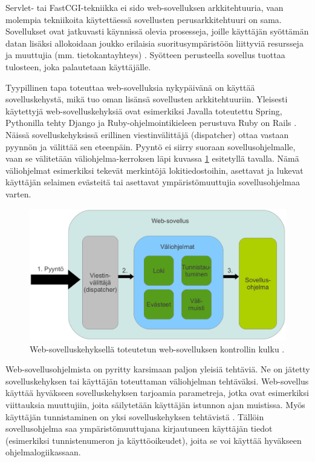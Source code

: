 Servlet- tai FastCGI-tekniikka ei sido web-sovelluksen arkkitehtuuria, vaan molempia tekniikoita käytettäessä sovellusten perusarkkitehtuuri on sama. Sovellukset ovat jatkuvasti käynnissä olevia prosesseja, joille käyttäjän syöttämän datan lisäksi allokoidaan joukko erilaisia suoritusympäristöön liittyviä resursseja ja muuttujia (mm. tietokantayhteys) \cite{uml}. Syötteen perusteella sovellus tuottaa tulosteen, joka palautetaan käyttäjälle.

Tyypillinen tapa toteuttaa web-sovelluksia nykypäivänä on käyttää sovelluskehystä, mikä tuo oman lisänsä sovellusten arkkitehtuuriin. Yleisesti käytettyjä web-sovelluskehyksiä ovat esimerkiksi Javalla toteutettu Spring, Pythonilla tehty Django ja Ruby-ohjelmointikieleen perustuva Ruby on Rails \cite{spring, django, ruby2011agile}. Näissä sovelluskehyksissä erillinen viestinvälittäjä (dispatcher) ottaa vastaan pyynnön ja välittää sen eteenpäin. Pyyntö ei siirry suoraan sovellusohjelmalle, vaan se välitetään väliohjelma-kerroksen läpi kuvassa \ref{dispatcher} esitetyllä tavalla. Nämä väliohjelmat esimerkiksi tekevät merkintöjä lokitiedostoihin, asettavat ja lukevat käyttäjän selaimen evästeitä tai asettavat ympäristömuuttujia sovellusohjelmaa varten.

\begin{figure}[h]
\centering
\includegraphics[width=\textwidth]{web/dispatcher.eps}
\caption{Web-sovelluskehyksellä toteutetun web-sovelluksen kontrollin kulku \cite{ruby2011agile}.}%
\label{dispatcher}
\end{figure}

Web-sovellusohjelmista on pyritty karsimaan paljon yleisiä tehtäviä. Ne on jätetty sovelluskehyksen tai käyttäjän toteuttaman väliohjelman tehtäväksi. Web-sovellus käyttää hyväkseen sovelluskehyksen tarjoamia parametreja, jotka ovat esimerkiksi viittauksia muuttujiin, joita säilytetään käyttäjän istunnon ajan muistissa. Myös käyttäjän tunnistaminen on yksi sovelluskehyksen tehtävistä \cite{ruby2011agile}. Tällöin sovellusohjelma saa ympäristömuuttujana kirjautuneen käyttäjän tiedot (esimerkiksi tunnistenumeron ja käyttöoikeudet), joita se voi käyttää hyväkseen ohjelmalogiikassaan.